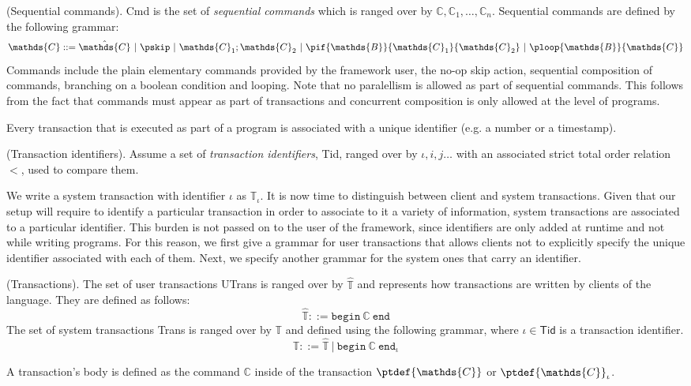 \begin{defn}
	(Sequential commands).
	\textsf{Cmd} is the set of \emph{sequential commands} which is ranged over by $\mathds{C}, \mathds{C}_1, \ldots, \mathds{C}_n$. Sequential commands are defined by the following grammar:
	\[
		\mathds{C} ::=
			\hat{\mathds{C}}\
			|\ \pskip\
			|\ \mathds{C}_1; \mathds{C}_2\
			|\ \pif{\mathds{B}}{\mathds{C}_1}{\mathds{C}_2}\
			|\ \ploop{\mathds{B}}{\mathds{C}}
	\]
	Commands include the plain elementary commands provided by the framework user, the no-op skip action, sequential composition of commands, branching on a boolean condition and looping. Note that no paralellism is allowed as part of sequential commands. This follows from the fact that commands must appear as part of transactions and concurrent composition is only allowed at the level of programs.
\end{defn}

Every transaction that is executed as part of a program is associated with a unique identifier (e.g. a number or a timestamp).
\begin{param}
	(Transaction identifiers).
	 Assume a set of \emph{transaction identifiers}, \textsf{Tid}, ranged over by $\iota, i, j \ldots$ with an associated strict total order relation $<$, used to compare them.
\end{param}
We write a system transaction with identifier $\iota$ as $\mathds{T}_\iota$. It is now time to distinguish between client and system transactions. Given that our setup will require to identify a particular transaction in order to associate to it a variety of information, system transactions are associated to a particular identifier. This burden is not passed on to the user of the framework, since identifiers are only added at runtime and not while writing programs. For this reason, we first give a grammar for user transactions that allows clients not to explicitly specify the unique identifier associated with each of them. Next, we specify another grammar for the system ones that carry an identifier.

\begin{defn}
	(Transactions).
	The set of user transactions \textsf{UTrans} is ranged over by $\hat{\mathds{T}}$ and represents how transactions are written by clients of the language. They are defined as follows:
	\[
		\hat{\mathds{T}} ::=
			\mathtt{begin}\ \mathds{C}\ \mathtt{end}
	\]
	The set of system transactions \textsf{Trans} is ranged over by $\mathds{T}$ and defined using the following grammar, where $\iota \in \mathsf{Tid}$ is a transaction identifier.
	\[
		\mathds{T} ::=
			\hat{\mathds{T}}\
			|\ \mathtt{begin}\ \mathds{C}\ \mathtt{end}_\iota
	\]
\end{defn}
A transaction's body is defined as the command $\mathds{C}$ inside of the transaction $\ptdef{\mathds{C}}$ or $\ptdef{\mathds{C}}_\iota$.

